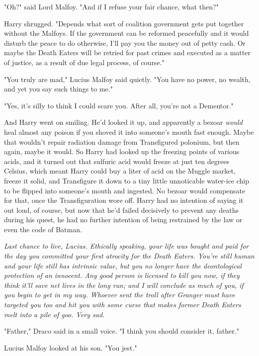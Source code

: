"Oh?" said Lord Malfoy. "And if I refuse your fair chance, what then?"

Harry shrugged. "Depends what sort of coalition government gets put together 
without the Malfoys. If the government can be reformed peacefully and it would 
disturb the peace to do otherwise, I'll pay you the money out of petty cash. Or 
maybe the Death Eaters will be retried for past crimes and executed as a matter 
of justice, as a result of due legal process, of course."

"You truly are mad," Lucius Malfoy said quietly. "You have no power, no wealth, 
and yet you say such things to me."

"Yes, it's silly to think I could scare you. After all, you're not a Dementor."

And Harry went on smiling. He'd looked it up, and apparently a bezoar 
\emph{would} heal almost any poison if you shoved it into someone's mouth fast 
enough. Maybe that wouldn't repair radiation damage from Transfigured polonium, 
but then again, maybe it would. So Harry had looked up the freezing points of 
various acids, and it turned out that sulfuric acid would freeze at just ten 
degrees Celsius, which meant Harry could buy a liter of acid on the Muggle 
market, freeze it solid, and Transfigure it down to a tiny little unnoticable 
water-ice chip to be flipped into someone's mouth and ingested. No bezoar would 
compensate for that, once the Transfiguration wore off. Harry had no intention 
of saying it out loud, of course, but now that he'd failed decisively to 
prevent any deaths during his quest, he had no further intention of being 
restrained by the law or even the code of Batman.

\emph{Last chance to live, Lucius. Ethically speaking, your life was bought and 
paid for the day you committed your first atrocity for the Death Eaters. You're 
still human and your life still has intrinsic value, but you no longer have the 
deontological protection of an innocent. Any good person is licensed to kill 
you now, if they think it'll save net lives in the long run; and I will 
conclude as much of you, if you begin to get in my way. Whoever sent the troll 
after Granger must have targeted you too and hit you with some curse that makes 
former Death Eaters melt into a pile of goo. Very sad.}

"Father," Draco said in a small voice. "I think you should consider it, father."

Lucius Malfoy looked at his son. "You jest."


